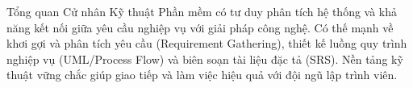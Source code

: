 \begin{rubric}{Tổng quan}
\entry*[]%
    Cử nhân Kỹ thuật Phần mềm có tư duy phân tích hệ thống và khả năng kết nối giữa yêu cầu nghiệp vụ với giải pháp công nghệ. Có thế mạnh về khơi gợi và phân tích yêu cầu (Requirement Gathering), thiết kế luồng quy trình nghiệp vụ (UML/Process Flow) và biên soạn tài liệu đặc tả (SRS). Nền tảng kỹ thuật vững chắc giúp giao tiếp và làm việc hiệu quả với đội ngũ lập trình viên.
\end{rubric}

